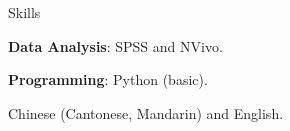 \begin{rubric}{Skills}

\entry*[Computer]
        \par \textbf{Data Analysis}: SPSS and NVivo.
        \par \textbf{Programming}: Python (basic).
\entry*[Language]
        \par Chinese (Cantonese, Mandarin) and English.
\end{rubric}
